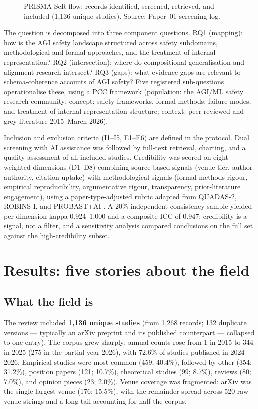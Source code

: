 \begin{figure}[htbp]
\centering

\caption{PRISMA-ScR flow: records identified, screened, retrieved, and included
(1,136 unique studies). Source: Paper~01 screening log.}
\label{fig:ch2-prisma}
\end{figure}

The question is decomposed into three component questions. RQ1 (mapping): how is the
AGI safety landscape structured across safety subdomains, methodological and formal
approaches, and the treatment of internal representation? RQ2 (intersection): where do
compositional generalisation and alignment research intersect? RQ3 (gaps): what
evidence gaps are relevant to schema-coherence accounts of AGI safety? Five registered
sub-questions operationalise these, using a PCC framework (population: the AGI/ML
safety research community; concept: safety frameworks, formal methods, failure modes,
and treatment of internal representation structure; context: peer-reviewed and grey
literature 2015--March 2026).

Inclusion and exclusion criteria (I1--I5, E1--E6) are defined in the protocol. Dual
screening with AI assistance was followed by full-text retrieval, charting, and a
quality assessment of all included studies. Credibility was scored on eight weighted
dimensions (D1--D8) combining source-based signals (venue tier, author authority,
citation uptake) with methodological signals (formal-methods rigour, empirical
reproducibility, argumentative rigour, transparency, prior-literature engagement),
using a paper-type-adjusted rubric adapted from QUADAS-2, ROBINS-I, and PROBAST+AI
\citep{whiting2011quadas2,sterne2016robinsi,moons2025probastaialpha}. A 20\% independent
consistency sample yielded per-dimension kappa 0.924--1.000 and a composite ICC of 0.947;
credibility is a signal, not a filter, and a sensitivity analysis compared conclusions
on the full set against the high-credibility subset.

\section{Results: five stories about the field}
\label{sec:ch2-results}

\subsection{What the field is}

The review included \textbf{1,136 unique studies} (from 1,268 records; 132 duplicate
versions --- typically an arXiv preprint and its published counterpart --- collapsed to
one entry). The corpus grew sharply: annual counts rose from 1 in 2015 to 344 in 2025
(275 in the partial year 2026), with 72.6\% of studies published in 2024--2026.
Empirical studies were most common (459; 40.4\%), followed by other (354; 31.2\%),
position papers (121; 10.7\%), theoretical studies (99; 8.7\%), reviews (80; 7.0\%),
and opinion pieces (23; 2.0\%). Venue coverage was fragmented: arXiv was the single
largest venue (176; 15.5\%), with the remainder spread across 520 raw venue strings
and a long tail accounting for half the corpus.

